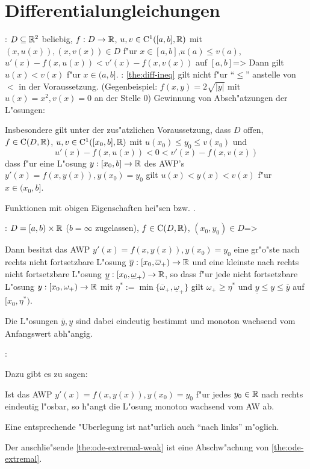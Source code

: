 \section{Differentialungleichungen}
\theorem:
  $D\subseteq\mathbb R^2$ beliebig, $f:D\to\mathbb R$,
  $u,v\in{\rm C}^1([a,b],\mathbb R)$ mit $(x,u(x)),(x,v(x))\in D$ f"ur
  $x\in[a,b]$,$u(a)\leq v(a)$, $u'(x)-f(x,u(x))<v'(x)-f(x,v(x))$ auf $[a,b]$=>{
  \label{the:diff-ineq}
  Dann gilt $u(x)<v(x)$ f"ur $x\in(a,b]$.
  }
\remark:{
  \ref{the:diff-ineq} gilt nicht f"ur ``$\leq$'' anstelle von $<$ in der
  Voraussetzung. (Gegenbeispiel: $f(x,y)=2\sqrt{|y|}$ mit $u(x)=x^2,v(x)=0$
  an der Stelle $0$)
  }
\remark Gewinnung von Absch"atzungen der L"osungen:{
  Insbesondere gilt unter der zus"atzlichen Voraussetzung, dass 
  $D$ offen, $f\in{\rm C}(D,\mathbb R)$,
  $u,v\in{\rm C}^1([x_0,b],\mathbb R)$ mit $u(x_0)\leq y_0\leq v(x_0)$ und
  \[u'(x)-f(x,u(x))<0<v'(x)-f(x,v(x))
    \]
  dass f"ur eine L"osung $y:[x_0,b]\to\mathbb R$ des AWP's 
  $y'(x)=f(x,y(x)),y(x_0)=y_0$ gilt $u(x)<y(x)<v(x)$ f"ur $x\in(x_0,b]$.
  
  Funktionen mit obigen Eigenschaften hei"sen 
  bzw. .
  }
\theorem:
  $D=[a,b)\times\mathbb R$ ($b=\infty$ zugelassen),
  $f\in{\rm C}(D,\mathbb R)$, $(x_0,y_0)\in D$=>{
  \label{the:ode-extremal}
  Dann besitzt das AWP $y'(x)=f(x,y(x)),y(x_0)=y_0$ 
  eine gr"o"ste nach rechts nicht fortsetzbare L"osung 
  $\overline y:[x_0,\overline\omega_+)\to\mathbb R$ 
  und eine kleinste nach rechts nicht fortsetzbare L"osung 
  $\underline y:[x_0,\underline\omega_+)\to\mathbb R$, so dass
  f"ur jede nicht fortsetzbare L"osung
  $y:[x_0,\omega_+)\to\mathbb R$ mit
  $\eta^*:=\min\{\overline\omega_+,\underline\omega_+\}$ gilt
  $\omega_+\geq\eta^*$ und $\underline y\leq y\leq\overline y$ auf
  $[x_0,\eta^*)$.
  
  Die L"osungen $\overline y,\underline y$ sind dabei eindeutig bestimmt
  und monoton wachsend vom Anfangswert abh"angig.
  }
\remark:{
  Dazu gibt es zu sagen:
  \begin{stmts}
    \item Ist das AWP $y'(x)=f(x,y(x)),y(x_0)=y_0$ f"ur jedes $y_0\in\mathbb R$
      nach rechts eindeutig l"osbar, so h"angt die L"osung monoton wachsend
      vom AW ab.
    \item Eine entsprechende "Uberlegung ist nat"urlich auch ``nach links''
      m"oglich.
    \item Der anschlie"sende \ref{the:ode-extremal-weak} ist eine 
      Abschw"achung von \ref{the:ode-extremal}.
    \end{stmts}
  }
